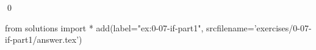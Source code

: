 
\begin{ex}
  \label{ex:0-07-if-part1}
  
  \qed
\end{ex}
\begin{python0}
from solutions import *
add(label="ex:0-07-if-part1",
    srcfilename='exercises/0-07-if-part1/answer.tex')
\end{python0}
